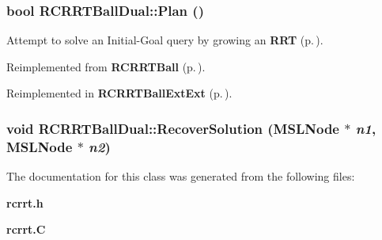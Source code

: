 \subsubsection{\setlength{\rightskip}{0pt plus 5cm}bool RCRRTBall\-Dual::Plan ()\hspace{0.3cm}{\tt  [virtual]}}\label{classRCRRTBallDual_a2}


Attempt to solve an Initial-Goal query by growing an {\bf RRT} {\rm (p.\,\pageref{classRRT})}.



Reimplemented from {\bf RCRRTBall} {\rm (p.\,\pageref{classRCRRTBall_a5})}.

Reimplemented in {\bf RCRRTBall\-Ext\-Ext} {\rm (p.\,\pageref{classRCRRTBallExtExt_a2})}.
\subsubsection{\setlength{\rightskip}{0pt plus 5cm}void RCRRTBall\-Dual::Recover\-Solution ({\bf MSLNode} $\ast$ {\em n1}, {\bf MSLNode} $\ast$ {\em n2})\hspace{0.3cm}{\tt  [protected]}}\label{classRCRRTBallDual_b0}




The documentation for this class was generated from the following files:\begin{CompactItemize}
\item 
{\bf rcrrt.h}\item 
{\bf rcrrt.C}\end{CompactItemize}
